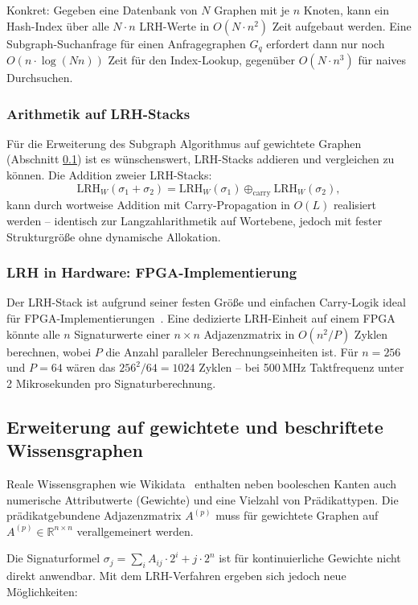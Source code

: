﻿\documentclass[a4paper,12pt]{article}
\theoremstyle{definition}
\begin{document}
Konkret: Gegeben eine Datenbank von $N$ Graphen mit je $n$ Knoten, kann ein
Hash-Index über alle $N \cdot n$ LRH-Werte in $O(N \cdot n^2)$ Zeit aufgebaut werden.
Eine Subgraph-Suchanfrage für einen Anfragegraphen $G_q$ erfordert dann nur noch
$O(n \cdot \log(Nn))$ Zeit für den Index-Lookup, gegenüber $O(N \cdot n^3)$ für
naives Durchsuchen.

\subsubsection{Arithmetik auf LRH-Stacks}

Für die Erweiterung des Subgraph Algorithmus auf gewichtete Graphen (Abschnitt
\ref{sec:ausblick_gewichtet}) ist es wünschenswert, LRH-Stacks addieren und
vergleichen zu können. Die Addition zweier LRH-Stacks:
\[
  \mathrm{LRH}_W(\sigma_1 + \sigma_2) = \mathrm{LRH}_W(\sigma_1)
  \oplus_{\mathrm{carry}} \mathrm{LRH}_W(\sigma_2),
\]
kann durch wortweise Addition mit Carry-Propagation in $O(L)$ realisiert werden --
identisch zur Langzahlarithmetik auf Wortebene, jedoch mit fester Strukturgröße
ohne dynamische Allokation.

\subsubsection{LRH in Hardware: FPGA-Implementierung}

Der LRH-Stack ist aufgrund seiner festen Größe und einfachen Carry-Logik ideal
für FPGA-Implementierungen~\cite{vhdl2019}. Eine dedizierte LRH-Einheit auf einem
FPGA könnte alle $n$ Signaturwerte einer $n \times n$ Adjazenzmatrix in $O(n^2 / P)$
Zyklen berechnen, wobei $P$ die Anzahl paralleler Berechnungseinheiten ist.
Für $n=256$ und $P=64$ wären das $256^2 / 64 = 1024$ Zyklen -- bei 500\,MHz
Taktfrequenz unter 2 Mikrosekunden pro Signaturberechnung.

\subsection{Erweiterung auf gewichtete und beschriftete Wissensgraphen}
\label{sec:ausblick_gewichtet}

Reale Wissensgraphen wie Wikidata~\cite{vrandecic2014} enthalten neben booleschen
Kanten auch numerische Attributwerte (Gewichte) und eine Vielzahl von Prädikattypen.
Die prädikatgebundene Adjazenzmatrix $A^{(p)}$ muss für gewichtete Graphen auf
$A^{(p)} \in \mathbb{R}^{n \times n}$ verallgemeinert werden.

Die Signaturformel $\sigma_j = \sum_{i} A_{ij} \cdot 2^i + j \cdot 2^n$ ist für
kontinuierliche Gewichte nicht direkt anwendbar. Mit dem LRH-Verfahren ergeben sich
jedoch neue Möglichkeiten:
\end{document}
